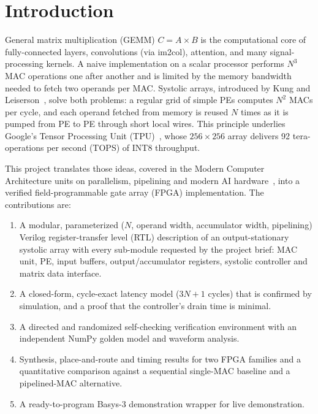 \documentclass[conference]{IEEEtran}
\begin{document}
\section{Introduction}
General matrix multiplication (GEMM) $C = A\times B$ is the computational core
of fully-connected layers, convolutions (via im2col), attention, and many
signal-processing kernels. A naive implementation on a scalar processor
performs $N^3$ MAC operations one after another and is limited by the memory
bandwidth needed to fetch two operands per MAC. Systolic arrays, introduced by
Kung and Leiserson~\cite{kung1979systolic,kung1982why}, solve both problems:
a regular grid of simple PEs computes $N^2$ MACs per cycle, and each operand
fetched from memory is reused $N$ times as it is pumped from PE to PE through
short local wires. This principle underlies Google's Tensor Processing Unit
(TPU)~\cite{jouppi2017tpu}, whose $256\times256$ array delivers 92 tera-operations
per second (TOPS) of INT8 throughput.

This project translates those ideas, covered in the Modern Computer Architecture units on
parallelism, pipelining and modern AI hardware~\cite{hennessy2019ca}, into a
verified field-programmable gate array (FPGA) implementation. The
contributions are:
\begin{enumerate}\setlength{\itemsep}{1pt}
\item A modular, parameterized ($N$, operand width, accumulator width,
  pipelining) Verilog register-transfer level (RTL) description of an output-stationary systolic array with every
  sub-module requested by the project brief: MAC unit, PE, input buffers,
  output/accumulator registers, systolic controller and matrix data interface.
\item A closed-form, cycle-exact latency model ($3N+1$ cycles) that is
  confirmed by simulation, and a proof that the controller's drain time is
  minimal.
\item A directed and randomized self-checking verification environment with
  an independent NumPy golden model and waveform analysis.
\item Synthesis, place-and-route and timing results for two FPGA families and a
  quantitative comparison against a sequential single-MAC baseline and a
  pipelined-MAC alternative.
\item A ready-to-program Basys-3 demonstration wrapper for live demonstration.
\end{enumerate}
\end{document}
